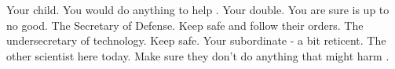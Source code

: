 \documentclass[char]{guildcamp3}
\begin{document}
\begin{contacts}
  \contact{\cSciOne{}} Your child. You would do anything to help \cSciOne{\them}. 
  \contact{\cRogueTwo{}} Your double. You are sure \cRogueTwo{\they} is up to no good. 
  \contact{\cPoliOne{}} The Secretary of Defense. Keep \cPoliOne{\them} safe and follow their orders.
  \contact{\cPoliTwo{}} The undersecretary of technology. Keep \cPoliTwo{\them} safe.
  \contact{\cSpecOpTwo{}} Your subordinate - a bit reticent.
  \contact{\cSciTwo{}} The other scientist here today. Make sure they don't do anything that might harm \cSciOne{\informal}.
\end{contacts}
\end{document}
